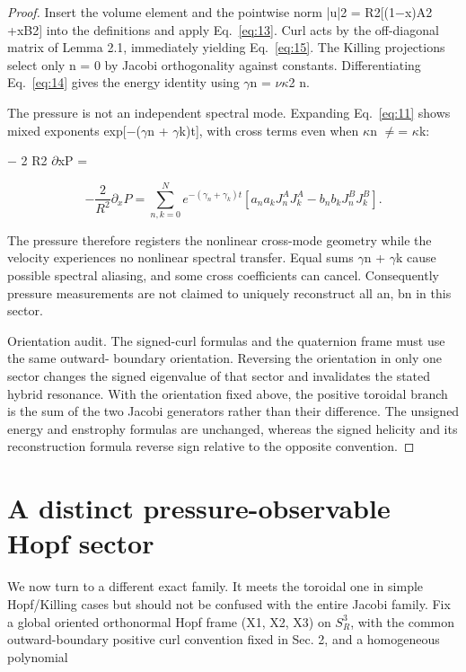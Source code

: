 \documentclass[10pt,letterpaper]{article}
\theoremstyle{remark}
\begin{document}
\begin{proof}
Insert the volume element and the pointwise norm |u|2 = R2[(1\(- \)x)A2 +xB2] into the definitions and apply Eq.~\eqref{eq:13}. Curl acts by the off-diagonal matrix of Lemma 2.1, immediately yielding Eq.~\eqref{eq:15}. The Killing projections select only n = 0 by Jacobi orthogonality against constants. Differentiating Eq.~\eqref{eq:14} gives the energy identity using \(\gamma \)n = \(\nu \kappa \)2 n.

The pressure is not an independent spectral mode. Expanding Eq.~\eqref{eq:11} shows mixed exponents exp[\(- \)(\(\gamma \)n + \(\gamma \)k)t], with cross terms even when \(\kappa \)n \(\ne \)= \(\kappa \)k:


\(- \) 2 R2 \(\partial \)xP =



\begin{equation}
\tag{18}\label{eq:18}
-\frac2{R^2}\partial_xP=\sum_{n,k=0}^Ne^{-(\gamma_n+\gamma_k)t}\left[a_na_kJ_n^AJ_k^A-b_nb_kJ_n^BJ_k^B\right].
\end{equation}

The pressure therefore registers the nonlinear cross-mode geometry while the velocity experiences no nonlinear spectral transfer. Equal sums \(\gamma \)n + \(\gamma \)k cause possible spectral aliasing, and some cross coefficients can cancel. Consequently pressure measurements are not claimed to uniquely reconstruct all an, bn in this sector.


Orientation audit. The signed-curl formulas and the quaternion frame must use the same outward- boundary orientation. Reversing the orientation in only one sector changes the signed eigenvalue of that sector and invalidates the stated hybrid resonance. With the orientation fixed above, the positive toroidal branch is the sum of the two Jacobi generators rather than their difference. The unsigned energy and enstrophy formulas are unchanged, whereas the signed helicity and its reconstruction formula reverse sign relative to the opposite convention.


\end{proof}

\section{A distinct pressure-observable Hopf sector}

We now turn to a different exact family. It meets the toroidal one in simple Hopf/Killing cases but should not be confused with the entire Jacobi family. Fix a global oriented orthonormal Hopf frame (X1, X2, X3) on \(S_R^3\), with the common outward-boundary positive curl convention fixed in Sec. 2, and a homogeneous polynomial
\end{document}
